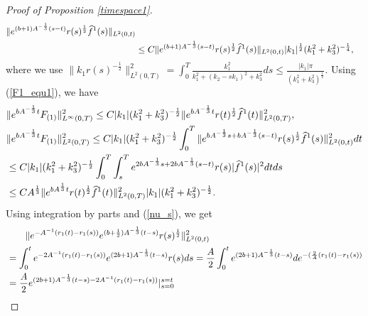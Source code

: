 \documentclass[12pt, reqno]{amsart}
\numberwithin{equation}{section}
\begin{document}
\begin{proof}[Proof of Proposition \ref{timespace1}]
\begin{equation}
\begin{aligned}
				\|{\rm e}^{(b+1)A^{-\frac{1}{3}}(s-t)}r(s)^{\frac{1}{2}}
				\widehat{f}^1(s)\|_{L^2(0,t)}\\
				&\leq C\|{\rm e}^{(b+1)A^{-\frac{1}{3}}(s-t)}r(s)^{\frac{1}{2}}
				\widehat{f}^1(s)\|_{L^2(0,t)}
				|k_1|^\frac{1}{2}{(k_1^2+k_3^2)^{-\frac{1}{4}}},	
			\end{aligned}
		\end{equation}
		where we use 
		$\|k_1r(s)^{-\frac{1}{2}}\|^2_{L^2(0,T)}=
		\int_0^T \frac{k_1^2}{k_1^2+(k_2-sk_1)^2+k_3^2}ds
		\leq \frac{|k_1|\pi}{(k_1^2+k_3^2)^{\frac{1}{2}}}.$
		Using (\ref{F1_equ1}), 
		we have 
		\begin{equation}\label{f1_result}
			\begin{aligned}
				&\|{\rm e}^{bA^{-\frac{1}{3}}t}F_{(1)}\|^2_{L^{\infty}(0,T)}\leq C{|k_1|(k_1^2+k_3^2)^{-\frac{1}{2}}}
				\|{\rm e}^{bA^{-\frac{1}{3}}t}r(t)^{\frac{1}{2}}\widehat{f}^1(t)\|_{L^2(0,T)}^{2},\\
				&\|{\rm e}^{bA^{-\frac{1}{3}}t}F_{(1)}\|^2_{L^2(0,T)} 
				\leq C{|k_1|(k_1^2+k_3^2)^{-\frac{1}{2}}}
				\int_{0}^{T}\|{\rm e}^{bA^{-\frac{1}{3}}s
					+bA^{-\frac{1}{3}}(s-t)}r(s)^{\frac{1}{2}}\widehat{f}^1(s)\|^2_{L^2(0,t)}dt\\
				&\leq C{|k_1|(k_1^2+k_3^2)^{-\frac{1}{2}}}
				\int_{0}^{T}\int_{s}^{T}{\rm e}^{2bA^{-\frac{1}{3}}s+2bA^{-\frac{1}{3}}(s-t)}r(s)|\widehat{f}^1(s)|^2dtds\\
				&\leq 
				CA^{\frac{1}{3}}\|{\rm e}^{bA^{\frac{1}{3}}t}r(t)^{\frac{1}{2}}\widehat{f}^1(t)\|_{L^2(0,T)}^2
				{|k_1|(k_1^2+k_3^2)^{-\frac{1}{2}}}.
			\end{aligned}
		\end{equation}
		Using integration by parts and (\ref{nu_s}), we get
		\begin{align*}
			&\qquad\|{\rm e}^{-{A}^{-1}\left(r_1(t)-r_1(s)\right)}
			{\rm e}^{(b+\frac12)A^{-\frac13 }(t-s)}r(s)^\frac{1}{2}\|_{L^2(0,t)}^2\\
			&=\int_0^t {\rm e}^{-2{A}^{-1}\left(r_1(t)-r_1(s)\right)}
			{\rm e}^{(2b+1)A^{-\frac13 }(t-s)}r(s)ds
			=\frac{A}{2}\int_0^t 
			{\rm e}^{(2b+1)A^{-\frac13 }(t-s)}d{\rm e}^{-(\frac{2}{A}\left(r_1(t)-r_1(s)\right)}\\
			&=\frac{A}{2}{\rm e}^{(2b+1)A^{-\frac13 }(t-s)-2A^{-1}\left(r_1(t)-r_1(s)\right)}|_{s=0}^{s=t}

\end{align*}
\end{proof}
\end{document}
